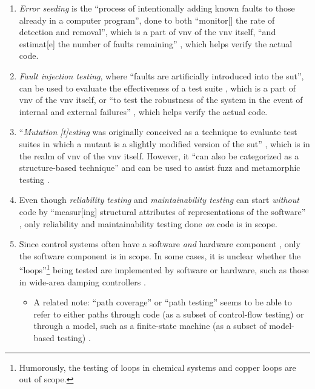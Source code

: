 \begin{enumerate}
      \item \emph{Error seeding} is the ``process of intentionally adding
            known faults to those already in a computer program'',
            done to both ``monitor[] the rate of detection and removal'',
            which is a part of \acs{vnv} of the \acs{vnv} itself, ``and
            estimat[e] the number of faults remaining''
            \citep[p.~165]{IEEE2017}, which helps verify the actual code.
      \item \emph{Fault injection testing}, where ``faults are artificially
            introduced into the \acs{sut}'', can be used to evaluate the
            effectiveness of a test suite \citep[p.~5-18]{SWEBOK2024},
            which is a part of \acs{vnv} of the \acs{vnv} itself, or ``to test
            the robustness of the system in the event of internal and
            external failures'' \citep[p.~42]{IEEE2022}, which helps verify
            the actual code.
      \item ``\emph{Mutation [t]esting} was originally conceived as a
            technique to evaluate test suites in which a mutant is a slightly
            modified version of the \acs{sut}'' \citep[p.~5-15]{SWEBOK2024},
            which is in the realm of \acs{vnv} of the \acs{vnv} itself.
            However, it ``can also be categorized as a structure-based
            technique'' and can be used to assist fuzz and metamorphic testing
            \citep[p.~5-15]{SWEBOK2024}.
      \item Even though \emph{reliability testing} and \emph{maintainability
                  testing} can start \emph{without} code by ``measur[ing]
            structural attributes of representations of the software''
            \citep[p.~18]{FentonAndPfleeger1997}, only reliability and
            maintainability testing done \emph{on} code is in scope.
      \item Since control systems often have a software \emph{and} hardware
            component \citep{ISO2015, PreußeEtAl2012,ForsythEtAl2004},
            only the software component is in scope. In some cases, it is
            unclear whether the ``loops''\footnote{Humorously, the testing of
                  loops in chemical systems \citep{Dominguez-PumarEtAl2020} and
                  copper loops \citep{Goralski1999} are out of scope.} being
            tested are implemented by software or hardware, such as those in
            wide-area damping controllers \citep{PierreEtAl2017, TrudnowskiEtAl2017}.
            \begin{itemize}
                  \item A related note: ``path coverage'' or ``path testing''
                        seems to be able to refer to either paths through code
                        (as a subset of control-flow testing)
                        \citep[p.~5-13]{SWEBOK2024} or through a model, such as
                        a finite-state machine (as a subset of model-based
                        testing) \citep[p.~184]{DoğanEtAl2014}.
            \end{itemize}
\end{enumerate}

